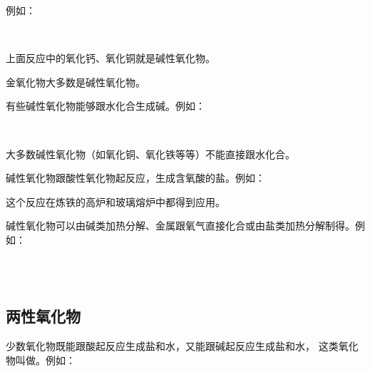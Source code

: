 例如：
\begin{fangchengshi}
     \\[-.8em]
\end{fangchengshi}

上面反应中的氧化钙、氧化铜就是碱性氧化物。

金氧化物大多数是碱性氧化物。

有些碱性氧化物能够跟水化合生成碱。例如：
\begin{fangchengshi}
     \\[-.8em]
\end{fangchengshi}

大多数碱性氧化物（如氧化铜、氧化铁等等）不能直接跟水化合。

碱性氧化物跟酸性氧化物起反应，生成含氧酸的盐。例如：
\begin{fangchengshi}
\end{fangchengshi}


这个反应在炼铁的高炉和玻璃熔炉中都得到应用。

碱性氧化物可以由碱类加热分解、金属跟氧气直接化合或由盐类加热分解制得。例如：

\begin{fangchengshi}
     \\[-.8em]
     \\[-.8em]
\end{fangchengshi}


\subsection{两性氧化物}

少数氧化物既能跟酸起反应生成盐和水，又能跟碱起反应生成盐和水，
这类氧化物叫做。例如：
\begin{fangchengshi}
     \\[-.8em]
     \\[-.8em]
     \\[-.8em]
\end{fangchengshi}



